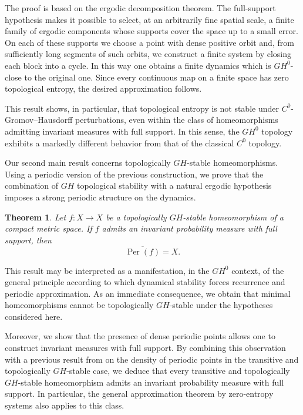 \documentclass{amsart}
\numberwithin{equation}{section}
\newtheorem{theorem}{Theorem}[section]
\theoremstyle{remark}
\DeclareMathOperator{\Per}{Per}
\begin{document}
The proof is based on the ergodic decomposition theorem. The full-support hypothesis makes it possible to select, at an arbitrarily fine spatial scale, a finite family of ergodic components whose supports cover the space up to a small error. On each of these supports we choose a point with dense positive orbit and, from sufficiently long segments of such orbits, we construct a finite system by closing each block into a cycle. In this way one obtains a finite dynamics which is $GH^0$-close to the original one. Since every continuous map on a finite space has zero topological entropy, the desired approximation follows.

This result shows, in particular, that topological entropy is not stable under $C^0$-Gromov--Hausdorff perturbations, even within the class of homeomorphisms admitting invariant measures with full support. In this sense, the $GH^0$ topology exhibits a markedly different behavior from that of the classical $C^0$ topology.

Our second main result concerns topologically $GH$-stable homeomorphisms. Using a periodic version of the previous construction, we prove that the combination of $GH$ topological stability with a natural ergodic hypothesis imposes a strong periodic structure on the dynamics.

\begin{theorem}
Let $f:X\to X$ be a topologically $GH$-stable homeomorphism of a compact metric space. If $f$ admits an invariant probability measure with full support, then
\[
\overline{\Per(f)}=X.
\]
\end{theorem}

This result may be interpreted as a manifestation, in the $GH^0$ context, of the general principle according to which dynamical stability forces recurrence and periodic approximation. As an immediate consequence, we obtain that minimal homeomorphisms cannot be topologically $GH$-stable under the hypotheses considered here.

Moreover, we show that the presence of dense periodic points allows one to construct invariant measures with full support. By combining this observation with a previous result from \cite{cubas2018propriedades} on the density of periodic points in the transitive and topologically $GH$-stable case, we deduce that every transitive and topologically $GH$-stable homeomorphism admits an invariant probability measure with full support. In particular, the general approximation theorem by zero-entropy systems also applies to this class.
\end{document}
